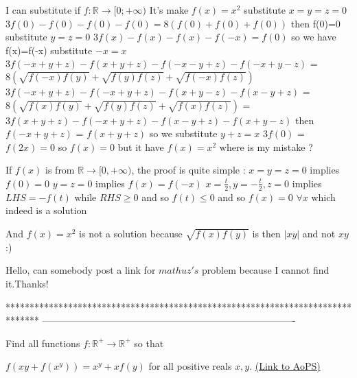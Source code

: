 \begin{solution}
	\begin{tcolorbox}I can substitute if ${ f:\mathbb{R}\to\mathbb[0;+\infty)} $ It's make $f(x)=x^2$ 
substitute $x=y=z=0$
$3f(0)-f(0)-f(0)-f(0)=8(f(0)+f(0)+f(0))$ then f(0)=0 
substitute $y=z=0$
$3f(x)-f(x)-f(x)-f(-x)=f(0)$ so we have f(x)=f(-x)
substitute $-x=x$
$ 3f(-x+y+z)-f(x+y+z)-f(-x-y+z)-f(-x+y-z) $ = $ 8(\sqrt{f(-x)f(y)}+\sqrt{f(y)f(z)}+\sqrt{f(-x)f(z)}) $ 
$ 3f(-x+y+z)-f(-x+y+z)-f(x+y-z)-f(x-y+z) $ = $ 8(\sqrt{f(x)f(y)}+\sqrt{f(y)f(z)}+\sqrt{f(x)f(z)}) $ = $3f(x+y+z)-f(-x+y+z)-f(x-y+z)-f(x+y-z) $
then $ f(-x+y+z)$ = $f(x+y+z)$
so we substitute $y+z=x$
$ 3f(0)$ = $f(2x)=0$
so $f(x)=0$ but it have $f(x)=x^2$
where is my mistake ?\end{tcolorbox}
If $f(x)$ is from $\mathbb R\to[0,+\infty)$, the proof is quite simple :
$x=y=z=0$ implies $f(0)=0$
$y=z=0$ implies $f(x)=f(-x)$
$x=\frac t2,y=-\frac t2,z=0$ implies $LHS=-f(t)$ while $RHS\ge 0$ and so $f(t)\le 0$ and so $\boxed{f(x)=0}$ $\forall x$  which indeed is a solution

And $f(x)=x^2$ is not a solution because $\sqrt{f(x)f(y)}$ is then $|xy|$ and not $xy$ :)
\end{solution}



\begin{solution}
	Hello,
  can somebody post a link for $mathuz's$ problem because I cannot find it.Thanks!
\end{solution}
*******************************************************************************
-------------------------------------------------------------------------------

\begin{problem}
	Find all functions $f:\mathbb R^{+} \longrightarrow \mathbb R^{+}$ so that 

$f(xy + f(x^y)) = x^y + xf(y)$ for all positive reals $x,y$.
	\flushright \href{https://artofproblemsolving.com/community/c6h536585}{(Link to AoPS)}
\end{problem}



